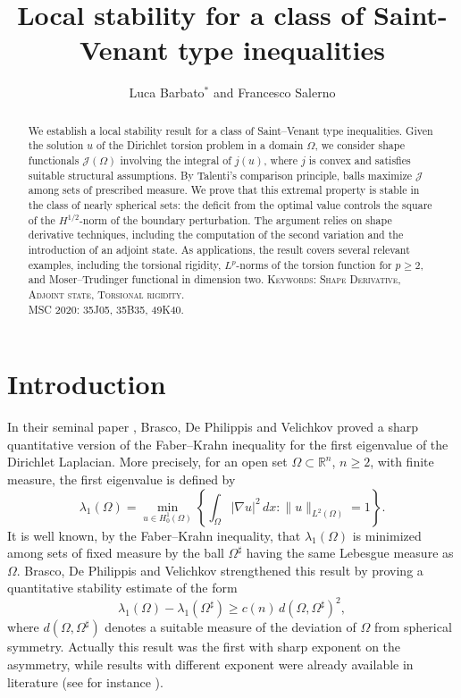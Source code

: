 \documentclass[oneside,a4paper,11pt,notitlepage]{article}
\title{Local stability for a class of Saint-Venant type inequalities}
\author{Luca Barbato$^\ast$ and Francesco Salerno}
\date{}
\theoremstyle{definition}
\theoremstyle{plain}
\theoremstyle{definition}
\begin{document}
\maketitle

\begin{abstract}
We establish a local stability result for a class of Saint–Venant type inequalities. Given the solution $u$ of the Dirichlet torsion problem in a domain $\Omega$, we consider shape functionals $\mathcal{J}(\Omega)$ involving the integral of $j(u)$, where $j$ is convex and satisfies suitable structural assumptions. By Talenti's comparison principle, balls maximize $\mathcal{J}$ among sets of prescribed measure. We prove that this extremal property is stable in the class of nearly spherical sets: the deficit from the optimal value controls the square of the $H^{1/2}$-norm of the boundary perturbation. The argument relies on shape derivative techniques, including the computation of the second variation and the introduction of an adjoint state. As applications, the result covers several relevant examples, including the torsional rigidity, $L^p$-norms of the torsion function for $p\ge 2$, and Moser–Trudinger functional in dimension two.
\newline
\newline
\textsc{Keywords: Shape Derivative, Adjoint state, Torsional rigidity.}   \\
\textsc{MSC 2020: 35J05, 35B35, 49K40.}   
\end{abstract}
\section{Introduction}
In their seminal paper \cite{BDPV}, Brasco, De Philippis and Velichkov proved a sharp quantitative version of the Faber--Krahn inequality for the first eigenvalue of the Dirichlet Laplacian. More precisely, for an open set $\Omega\subset\mathbb{R}^n$, $n\geq 2$, with finite measure, the first eigenvalue is defined by
\begin{equation*}
    \lambda_1(\Omega)=\min_{u\in H^1_0(\Omega)}\left\{\int_\Omega |\nabla u|^2\,dx :\|u\|_{L^2(\Omega)}=1\right\}.
\end{equation*}
It is well known, by the Faber--Krahn inequality, that $\lambda_1(\Omega)$ is minimized among sets of fixed measure by the ball $\Omega^\sharp$ having the same Lebesgue measure as $\Omega$. Brasco, De Philippis and Velichkov strengthened this result by proving a quantitative stability estimate of the form
\begin{equation*}
    \lambda_1(\Omega)-\lambda_1(\Omega^\sharp)\geq c(n)\, d(\Omega,\Omega^\sharp)^2,
\end{equation*}
where $d(\Omega,\Omega^\sharp)$ denotes a suitable measure of the deviation of $\Omega$ from spherical symmetry. Actually this result was the first with sharp exponent on the asymmetry, while results with different exponent were already available in literature (see for instance \cite{BW, FMP, N}).
\end{document}
